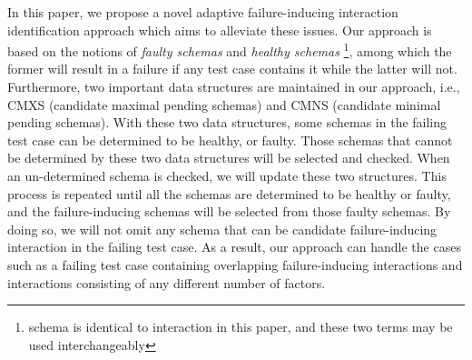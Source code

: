 \documentclass{sig-alternate-05-2015}
\begin{document}
In this paper, we propose a novel adaptive failure-inducing interaction identification approach which aims to alleviate these issues. Our approach is based on the notions of \emph{faulty schemas} and \emph{healthy schemas} \footnote{schema is identical to interaction in this paper, and these two terms may be used interchangeably}, among which the former will result in a failure if any test case contains it while the latter will not. Furthermore, two important data structures are maintained in our approach, i.e., CMXS (candidate maximal pending schemas) and CMNS (candidate minimal pending schemas). With these two data structures, some schemas in the failing test case can be determined to be healthy, or faulty. Those schemas that cannot be determined by these two data structures will be selected and checked. When an un-determined schema is checked, we will update these two structures. This process is repeated until all the schemas are determined to be healthy or faulty, and the failure-inducing schemas will be selected from those faulty schemas. By doing so, we will not omit any schema that can be candidate failure-inducing interaction in the failing test case. As a result, our approach can handle the cases such as a failing test case containing overlapping failure-inducing interactions and interactions consisting of any different number of factors.

\end{document}
